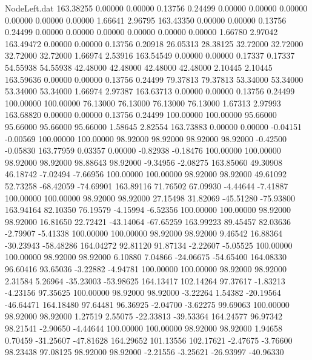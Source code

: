 \begin{filecontents}{NodeLeft.dat}
 163.38255    0.00000    0.00000     0.13756    0.24499    0.00000    0.00000    0.00000    0.00000    0.00000    0.00000    1.66641    2.96795
 163.43350    0.00000    0.00000     0.13756    0.24499    0.00000    0.00000    0.00000    0.00000    0.00000    0.00000    1.66780    2.97042
 163.49472    0.00000    0.00000     0.13756    0.20918   26.05313   28.38125   32.72000   32.72000   32.72000   32.72000    1.66974    2.53916
 163.54549    0.00000    0.00000     0.17337    0.17337   54.55938   54.55938   42.48000   42.48000   42.48000   42.48000    2.10445    2.10445
 163.59636    0.00000    0.00000     0.13756    0.24499   79.37813   79.37813   53.34000   53.34000   53.34000   53.34000    1.66974    2.97387
 163.63713    0.00000    0.00000     0.13756    0.24499  100.00000  100.00000   76.13000   76.13000   76.13000   76.13000    1.67313    2.97993
 163.68820    0.00000    0.00000     0.13756    0.24499  100.00000  100.00000   95.66000   95.66000   95.66000   95.66000    1.58645    2.82554
 163.73883    0.00000    0.00000    -0.04151   -0.00569  100.00000  100.00000   98.92000   98.92000   98.92000   98.92000   -0.42500   -0.05830
 163.77959    0.03357    0.00000    -0.82938   -0.18476  100.00000  100.00000   98.92000   98.92000   98.88643   98.92000   -9.34956   -2.08275
 163.85060   49.30908   46.18742    -7.02494   -7.66956  100.00000  100.00000   98.92000   98.92000   49.61092   52.73258  -68.42059  -74.69901
 163.89116   71.76502   67.09930    -4.44644   -7.41887  100.00000  100.00000   98.92000   98.92000   27.15498   31.82069  -45.51280  -75.93800
 163.94164   82.10350   76.19579    -4.15994   -6.52356  100.00000  100.00000   98.92000   98.92000   16.81650   22.72421  -43.14064  -67.65259
 163.99223   89.45457   82.03636    -2.79907   -5.41338  100.00000  100.00000   98.92000   98.92000    9.46542   16.88364  -30.23943  -58.48286
 164.04272   92.81120   91.87134    -2.22607   -5.05525  100.00000  100.00000   98.92000   98.92000    6.10880    7.04866  -24.06675  -54.65400
 164.08330   96.60416   93.65036    -3.22882   -4.94781  100.00000  100.00000   98.92000   98.92000    2.31584    5.26964  -35.23003  -53.98625
 164.13417  102.14264   97.37617    -1.83213   -4.23156   97.35625  100.00000   98.92000   98.92000   -3.22264    1.54382  -20.19564  -46.64471
 164.18480   97.64481   96.36925    -2.04700   -3.62275   99.69063  100.00000   98.92000   98.92000    1.27519    2.55075  -22.33813  -39.53364
 164.24577   96.97342   98.21541    -2.90650   -4.44644  100.00000  100.00000   98.92000   98.92000    1.94658    0.70459  -31.25607  -47.81628
 164.29652  101.13556  102.17621    -2.47675   -3.76600   98.23438   97.08125   98.92000   98.92000   -2.21556   -3.25621  -26.93997  -40.96330

\end{filecontents}
